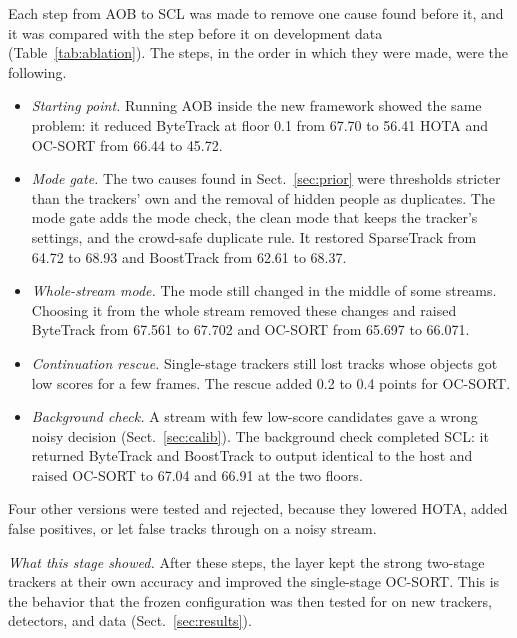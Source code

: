 \documentclass[pdflatex,sn-mathphys-num,iicol]{sn-jnl}
\makeatletter
\def\subsectionfont{\reset@font\fontfamily{\rmdefault}\fontsize{10bp}{12bp}\bfseries\selectfont\raggedright\boldmath}
\renewcommand\subsection{\@startsection{subsection}{2}{\z@}{-7pt \@plus -2pt \@minus -2pt}{3pt}{\subsectionfont}}
\newcommand{\scl}{SCL}
\newcommand{\aob}{AOB}
\makeatother
\begin{document}
\subsection{Design steps}\label{sec:steps}
Each step from \aob{} to \scl{} was made to remove one cause found before it,
and it was compared with the step before it on development data
(Table~\ref{tab:ablation}). The steps, in the order in which they were made,
were the following.
\begin{itemize}
\item \emph{Starting point.} Running \aob{} inside the new framework showed
      the same problem: it reduced ByteTrack at floor 0.1 from 67.70 to 56.41
      HOTA and OC-SORT from 66.44 to 45.72.
\item \emph{Mode gate.} The two causes found in Sect.~\ref{sec:prior} were
      thresholds stricter than the trackers' own and the removal of hidden
      people as duplicates. The mode gate adds the mode check, the clean mode
      that keeps the tracker's settings, and the crowd-safe duplicate rule. It
      restored SparseTrack from 64.72 to 68.93 and BoostTrack from 62.61
      to 68.37.
\item \emph{Whole-stream mode.} The mode still changed in the middle of some
      streams. Choosing it from the whole stream removed these changes and
      raised ByteTrack from 67.561 to 67.702 and OC-SORT from 65.697 to
      66.071.
\item \emph{Continuation rescue.} Single-stage trackers still lost tracks
      whose objects got low scores for a few frames. The rescue added 0.2 to
      0.4 points for OC-SORT.
\item \emph{Background check.} A stream with few low-score candidates gave a
      wrong noisy decision (Sect.~\ref{sec:calib}). The background check
      completed \scl{}: it returned ByteTrack and BoostTrack to output
      identical to the host and raised OC-SORT to 67.04 and 66.91 at the two
      floors.
\end{itemize}
Four other versions were tested and rejected, because they lowered HOTA,
added false positives, or let false tracks through on a noisy stream.

\emph{What this stage showed.} After these steps, the layer kept the strong
two-stage trackers at their own accuracy and improved the single-stage
OC-SORT. This is the behavior that the frozen configuration was then tested
for on new trackers, detectors, and data (Sect.~\ref{sec:results}).
\end{document}

